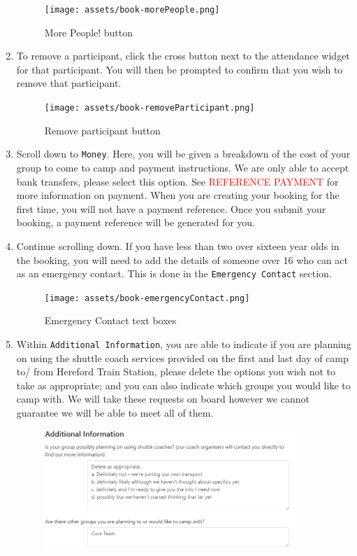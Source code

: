 \begin{enumerate}
    \begin{figure}[H]
        \centering
        \texttt{[image: assets/book-morePeople.png]}
        \caption{More People! button}
    \end{figure}
    \item To remove a participant, click the cross button next to the attendance widget for that participant. You will then be prompted to confirm that you wish to remove that participant.
    \begin{figure}[H]
        \centering
        \texttt{[image: assets/book-removeParticipant.png]}
        \caption{Remove participant button}
    \end{figure}
    \item Scroll down to \verb|Money|. Here, you will be given a breakdown of the cost of your group to come to camp and payment instructions. We are only able to accept bank transfers, please select this option. See \textcolor{red}{REFERENCE PAYMENT} for more information on payment. When you are creating your booking for the first time, you will not have a payment reference. Once you submit your booking, a payment reference will be generated for you. 
    \item Continue scrolling down. If you have less than two over sixteen year olds in the booking, you will need to add the details of someone over 16 who can act as an emergency contact. This is done in the \verb|Emergency Contact| section. 
    \begin{figure}[H]
        \centering
        \texttt{[image: assets/book-emergencyContact.png]}
        \caption{Emergency Contact text boxes}
    \end{figure}
    \item Within \verb|Additional Information|, you are able to indicate if you are planning on using the shuttle coach services provided on the first and last day of camp to/ from Hereford Train Station, please delete the options you wish not to take as appropriate; and you can also indicate which groups you would like to camp with. We will take these requests on board however we cannot guarantee we will be able to meet all of them.
    \begin{figure}[H]
        \centering
        \includegraphics[width=0.9\textwidth]{assets/book-additionalInfo.png}

\end{figure}
\end{enumerate}

